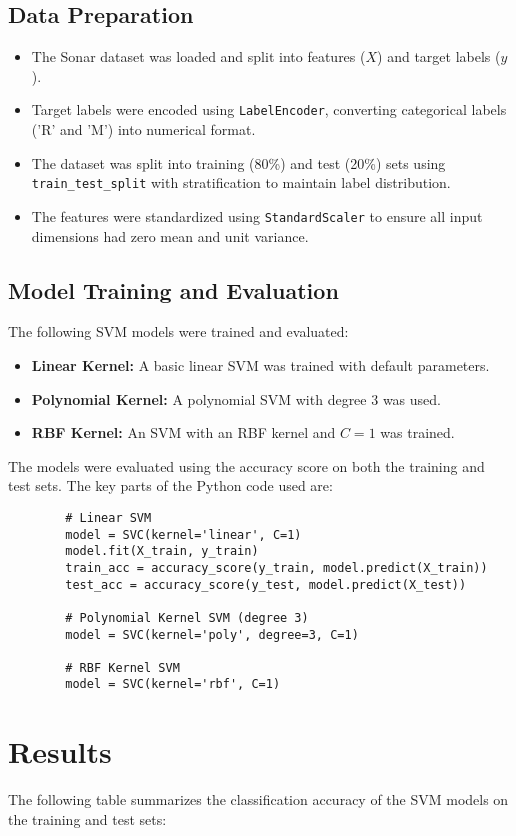 \documentclass[a4paper, 11pt]{article}
\begin{document}
	\subsection*{Data Preparation}
	\begin{itemize}
		\item The Sonar dataset was loaded and split into features (\(X\)) and target labels (\(y\)).
		\item Target labels were encoded using \texttt{LabelEncoder}, converting categorical labels ('R' and 'M') into numerical format.
		\item The dataset was split into training (80\%) and test (20\%) sets using \texttt{train\_test\_split} with stratification to maintain label distribution.
		\item The features were standardized using \texttt{StandardScaler} to ensure all input dimensions had zero mean and unit variance.
	\end{itemize}
	
	\subsection*{Model Training and Evaluation}
	The following SVM models were trained and evaluated:
	\begin{itemize}
		\item \textbf{Linear Kernel:} A basic linear SVM was trained with default parameters.
		\item \textbf{Polynomial Kernel:} A polynomial SVM with degree 3 was used.
		\item \textbf{RBF Kernel:} An SVM with an RBF kernel and \(C = 1\) was trained.
	\end{itemize}
	
	The models were evaluated using the accuracy score on both the training and test sets. The key parts of the Python code used are:
	
	\begin{verbatim}
		# Linear SVM
		model = SVC(kernel='linear', C=1)
		model.fit(X_train, y_train)
		train_acc = accuracy_score(y_train, model.predict(X_train))
		test_acc = accuracy_score(y_test, model.predict(X_test))
		
		# Polynomial Kernel SVM (degree 3)
		model = SVC(kernel='poly', degree=3, C=1)
		
		# RBF Kernel SVM
		model = SVC(kernel='rbf', C=1)
	\end{verbatim}
	\newpage
	\section*{Results}
	The following table summarizes the classification accuracy of the SVM models on the training and test sets:
	
\end{document}
